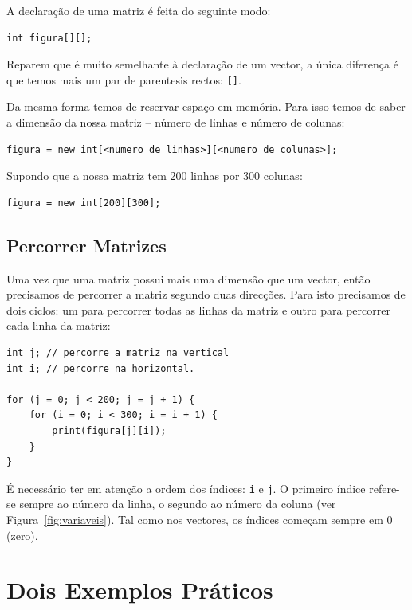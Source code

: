 A declaração de uma matriz é feita do seguinte modo:
\begin{lstlisting}
int figura[][];
\end{lstlisting}
Reparem que é muito semelhante à declaração de um vector, a única diferença é que temos mais um par de parentesis rectos: \texttt{[]}.

Da mesma forma temos de reservar espaço em memória. Para isso temos de saber a dimensão da nossa matriz -- número de linhas e número de colunas:
\begin{lstlisting}
figura = new int[<numero de linhas>][<numero de colunas>];
\end{lstlisting}
Supondo que a nossa matriz tem 200 linhas por 300 colunas:
\begin{lstlisting}
figura = new int[200][300];
\end{lstlisting}

\subsection{Percorrer Matrizes}
Uma vez que uma matriz possui mais uma dimensão que um vector, então precisamos de percorrer a matriz segundo duas direcções. Para isto precisamos de dois ciclos: um para percorrer todas as linhas da matriz e outro para percorrer cada linha da matriz:
\begin{lstlisting}
int j; // percorre a matriz na vertical
int i; // percorre na horizontal.

for (j = 0; j < 200; j = j + 1) {
    for (i = 0; i < 300; i = i + 1) {
        print(figura[j][i]);
    }
}
\end{lstlisting}
É necessário ter em atenção a ordem dos índices: \texttt{i} e \texttt{j}. O primeiro índice refere-se sempre ao número da linha, o segundo ao número da coluna (ver Figura~\ref{fig:variaveis}). Tal como nos vectores, os índices começam sempre em 0 (zero).



\section{Dois Exemplos Práticos }

